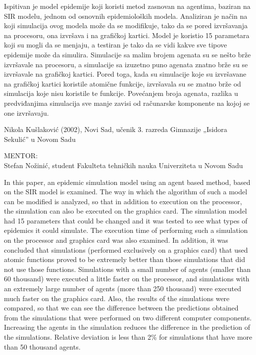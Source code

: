 \begin{Abstract}
Ispitivan je model epidemije koji koristi metod zasnovan na agentima, baziran na SIR modelu, jednom od osnovnih epidemioloških modela. Analiziran je način na koji simulacija ovog modela može da se modifikuje, tako da se pored izvršavanja na procesoru, ona izvršava i na grafičkoj kartici. Model je koristio 15 parametara koji su mogli da se menjaju, a testiran je tako da se vidi kakve sve tipove epidemije može da simulira. Simulacije sa malim brojem agenata su se nešto brže izvršavale na procesoru, a simulacije sa izuzetno puno agenata znatno brže su se izvršavale na grafičkoj kartici. Pored toga, kada su simulacije koje su izvršavane na grafičkoj kartici koristile atomične funkcije, izvršavala su se znatno brže od simulacija koje nisu koristile te funkcije. Povećanjem broja agenata, razlika u predviđanjima simulacija sve manje zavisi od računarske komponente na kojoj se one izvršavaju. 

\end{Abstract}
\begin{AuthorEx}
Nikola Kušlaković (2002), Novi Sad, učenik 3. razreda Gimnazije „Isidora Sekulić” u Novom Sadu

MENTOR:\\
Stefan Nožinić, student Fakulteta tehničkih nauka Univerziteta u Novom Sadu
\end{AuthorEx}
\begin{AbstractEng}
In this paper, an epidemic simulation model using an agent based method, based on the SIR model is examined. The way in which the algorithm of such a model can be modified is analyzed, so that in addition to execution on the processor, the simulation can also be executed on the graphics card. The simulation model had 15 parameters that could be changed and it was tested to see what types of epidemics it could simulate. The execution time of performing such a simulation on the processor and graphics card was also examined. In addition, it was concluded that simulations (performed exclusively on a graphics card) that used atomic functions proved to be extremely better than those simulations that did not use those functions. Simulations with a small number of agents (smaller than 60 thousand) were executed a little faster on the processor, and simulations with an extremely large number of agents (more than 250 thousand) were executed much faster on the graphics card. Also, the results of the simulations were compared, so that we can see the difference between the predictions obtained from the simulations that were performed on two different computer components. Increasing the agents in the simulation reduces the difference in the prediction of the simulations. Relative deviation is less than 2\% for simulations that have more than 50 thousand agents.
\end{AbstractEng}

